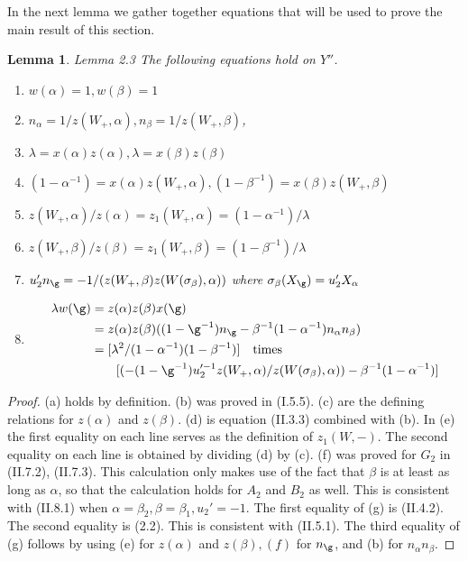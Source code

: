 \documentclass{memo-l}
\newtheorem{lemma}[theorem]{Lemma}
\theoremstyle{definition}
\theoremstyle{remark}
\numberwithin{section}{chapter}
\numberwithin{equation}{chapter}
\begin{document}
{\medskip}

In the next lemma we gather together equations that will be used to prove
the main result of this section.

\begin{lemma}{Lemma 2.3}   The following equations hold on $Y''$.
\begin{enumerate}[label=(\alph*)]
\item $w({\alpha}) = 1, w({\beta}) = 1$
\item $n_{\alpha} = 1/z(W_{+},{\alpha}), n_{\beta} =
1/z(W_{+},{\beta})$,
\item ${\lambda} = x({\alpha})z({\alpha}), {\lambda} =
x({\beta})z({\beta})$
\item $(1-{\alpha}^{-1}) = x({\alpha})z(W_{+},{\alpha}),
(1-{\beta}^{-1}) = x({\beta})z(W_{+},{\beta})$
\item $z(W_{+},{\alpha})/z({\alpha}) = z_{1}(W_{+},{\alpha}) =
(1-{\alpha}^{-1})/{\lambda}$
\item[] $z(W_{+},{\beta})/z({\beta}) = z_{1}(W_{+},{\beta}) =
(1-{\beta}^{-1})/{\lambda}$
\item $u_{2}'n_{{\g}} = -1/(z(W_{+},{\beta})z(W({\sigma}_{\beta}),
{\alpha}))$ where ${\sigma}_{\beta}(X_{{\g}}) = u_{2}'X_{\alpha}$
\item $$\aligned
{\lambda}w({\g}) &= z({\alpha})z({\beta})x({\g}) \\
&=
z({\alpha})z({\beta})((1-{\g}^{-1})n_{{\g}} - {\beta}^{-1}
(1-{\alpha}^{-1})n_{\alpha}n_{\beta})
\\ &=
[{\lambda}^{2}/(1-{\alpha}^{-1})(1-{\beta}^{-1})] \quad
\hbox{times}\\
&\quad\quad [(-(1-{\g}^{-1})
u_{2}^{\prime-1}z(W_+,{\alpha})/z(W({\sigma}_{\beta}),{\alpha})) -
{\beta}^{-1}(1-{\alpha}^{-1})]\endaligned$$
\end{enumerate}
\end{lemma}

\medpagebreak

\begin{proof}    (a) holds by definition.  (b) was proved in (I.5.5).
(c) are the defining relations for $z({\alpha})$ and $z({\beta})$.
(d) is equation (II.3.3) combined with (b).
In (e) the first equality on each line serves as the definition of
$z_{1}(W,-)$.
 The second equality on each line is obtained by dividing (d) by (c).
(f) was proved for $G_{2}$ in (II.7.2), (II.7.3).
 This calculation only makes use of the fact that ${\beta}$ is at least as
long as ${\alpha}$,
so that the calculation holds for $A_{2}$ and $B_{2}$ as well.
 This is consistent with (II.8.1) when ${\alpha} = {\beta}_{2},
{\beta}={\beta}_{1}, u_{2}'=-1$.
 The first equality of (g) is (II.4.2).
 The second equality is (2.2).
 This is consistent with (II.5.1).
 The third equality of (g) follows by using (e) for $z({\alpha})$ and
$z({\beta}), (f)$ for $n_{{\g}}$, and (b) for $n_{\alpha}n_{\beta}$.
\end{proof}
\end{document}
